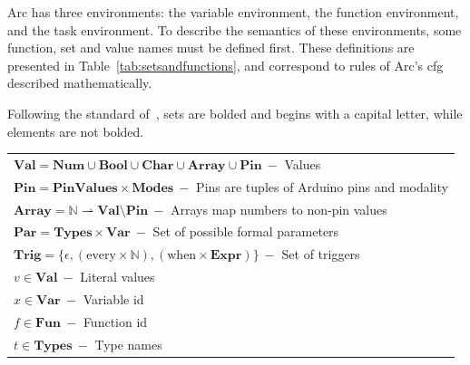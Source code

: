 Arc has three environments: the variable environment, the function environment, and the task environment. To describe the semantics of these environments, some function, set and value names must be defined first. These definitions are presented in Table~\ref{tab:setsandfunctions}, and correspond to rules of Arc's \gls{cfg} described mathematically.

Following the standard of~\cite{Huttel2010}, sets are bolded and begins with a capital letter, while elements are not bolded.


\begin{table}[htb!]
    \centering
    \begin{tabular}{l}
        \toprule
        $\textbf{Val} = \textbf{Num} \cup \textbf{Bool} \cup \textbf{Char} \cup \textbf{Array} \cup \textbf{Pin}\ -$ Values                                                        \\
        $\textbf{Pin} = \textbf{PinValues} \times \textbf{Modes}\ -$ Pins are tuples of Arduino pins and modality                                                                  \\
        $\textbf{Array} = \mathbb{N} \rightharpoonup \textbf{Val} \setminus \textbf{Pin}\ -$ Arrays map numbers to non-pin values                                                  \\
        $\textbf{Par} = \textbf{Types} \times \textbf{Var}\ -$ Set of possible formal parameters                                                                                   \\
        $\textbf{Trig} = \{\epsilon, (\text{every} \times \mathbb{N}), (\text{when} \times \textbf{Expr}) \}\ -$ Set of triggers                                                   \\
        $v \in \textbf{Val}\ -$ Literal values                                                                                                                                     \\
        $x \in \textbf{Var}\ -$ Variable id                                                                                                                                        \\
        $f \in \textbf{Fun}\ -$ Function id                                                                                                                                        \\
        $t \in \textbf{Types}\ -$ Type names                                                                                                                                       \\

\end{tabular}
\end{table}

